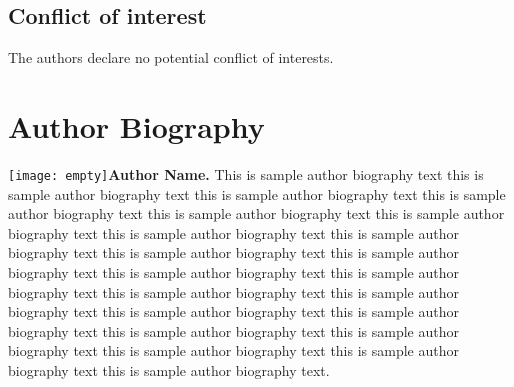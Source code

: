 \documentclass[APA,LATO1COL]{WileyNJD-v2}
\begin{document}
\subsection*{Conflict of interest}

The authors declare no potential conflict of interests.


\appendix
%


\section*{Author Biography}

\begin{biography}{\texttt{[image: empty]}}{\textbf{Author Name.} This is sample author biography text this is sample author biography text this is sample author biography text this is sample author biography text this is sample author biography text this is sample author biography text this is sample author biography text this is sample author biography text this is sample author biography text this is sample author biography text this is sample author biography text this is sample author biography text this is sample author biography text this is sample author biography text this is sample author biography text this is sample author biography text this is sample author biography text this is sample author biography text this is sample author biography text this is sample author biography text this is sample author biography text.}
\end{biography}
\end{document}
